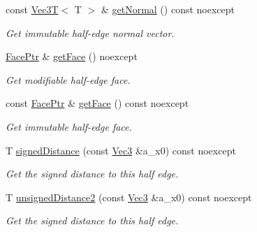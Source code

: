 \begin{DoxyCompactItemize}
\mbox{\label{classDcel_1_1EdgeT_a60b8b2acf41484ff0c521310cece56a3}} 
const \hyperlink{classVec3T}{Vec3T}$<$ T $>$ \& \hyperlink{classDcel_1_1EdgeT_a60b8b2acf41484ff0c521310cece56a3}{get\+Normal} () const noexcept
\begin{DoxyCompactList}\small\item\em Get immutable half-\/edge normal vector. \end{DoxyCompactList}\item 
\mbox{\label{classDcel_1_1EdgeT_a522de398f834c68701e4a44f2c9ba972}} 
\hyperlink{classDcel_1_1EdgeT_a97dd9849ea4a21223095f852e48e36e8}{Face\+Ptr} \& \hyperlink{classDcel_1_1EdgeT_a522de398f834c68701e4a44f2c9ba972}{get\+Face} () noexcept
\begin{DoxyCompactList}\small\item\em Get modifiable half-\/edge face. \end{DoxyCompactList}\item 
\mbox{\label{classDcel_1_1EdgeT_a3966ae6b38b26c618cfb56bd5adb8b54}} 
const \hyperlink{classDcel_1_1EdgeT_a97dd9849ea4a21223095f852e48e36e8}{Face\+Ptr} \& \hyperlink{classDcel_1_1EdgeT_a3966ae6b38b26c618cfb56bd5adb8b54}{get\+Face} () const noexcept
\begin{DoxyCompactList}\small\item\em Get immutable half-\/edge face. \end{DoxyCompactList}\item 
T \hyperlink{classDcel_1_1EdgeT_adba2d72aed5f510997d06c2bc9e6e96c}{signed\+Distance} (const \hyperlink{classDcel_1_1EdgeT_a93b8679cea557c419af44385ca6d356a}{Vec3} \&a\+\_\+x0) const noexcept
\begin{DoxyCompactList}\small\item\em Get the signed distance to this half edge. \end{DoxyCompactList}\item 
T \hyperlink{classDcel_1_1EdgeT_a50345997f00af679875fda510b3e0607}{unsigned\+Distance2} (const \hyperlink{classDcel_1_1EdgeT_a93b8679cea557c419af44385ca6d356a}{Vec3} \&a\+\_\+x0) const noexcept
\begin{DoxyCompactList}\small\item\em Get the signed distance to this half edge. \end{DoxyCompactList}\end{DoxyCompactItemize}
